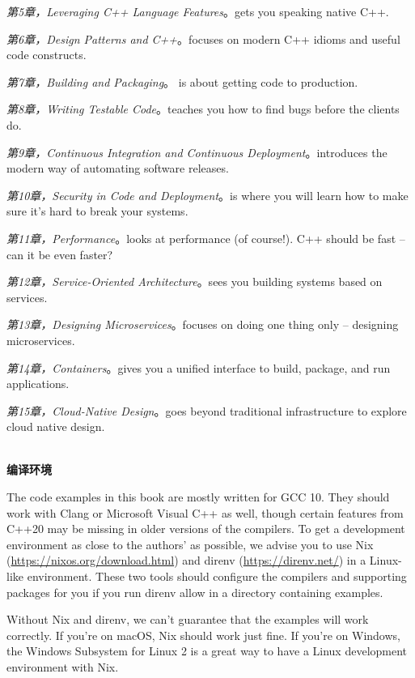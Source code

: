 \textit{第5章，Leveraging C++ Language Features}。gets you speaking native C++.

\textit{第6章，Design Patterns and C++}。focuses on modern C++ idioms and useful code constructs.

\textit{第7章，Building and Packaging}。 is about getting code to production.

\textit{第8章，Writing Testable Code}。teaches you how to find bugs before the clients do.

\textit{第9章，Continuous Integration and Continuous Deployment}。introduces the modern way of automating software releases.


\textit{第10章，Security in Code and Deployment}。is where you will learn how to make sure it's hard to break your systems.

\textit{第11章，Performance}。looks at performance (of course!). C++ should be fast – can it be even faster?


\textit{第12章，Service-Oriented Architecture}。sees you building systems based on services.

\textit{第13章，Designing Microservices}。focuses on doing one thing only – designing microservices.

\textit{第14章，Containers}。gives you a unified interface to build, package, and run applications.

\textit{第15章，Cloud-Native Design}。goes beyond traditional infrastructure to explore cloud native design.

\hspace*{\fill} \\ %
\textbf{编译环境}

The code examples in this book are mostly written for GCC 10. They should work with Clang or Microsoft Visual C++ as well, though certain features from C++20 may be missing in older versions of the compilers. To get a development environment as close to the authors' as possible, we advise you to use Nix (\url{https://nixos.org/download.html}) and direnv (\url{https://direnv.net/}) in a Linux-like environment. These two tools should configure the compilers and supporting packages for you if you run direnv allow in a directory containing examples.

Without Nix and direnv, we can't guarantee that the examples will work correctly. If you're on macOS, Nix should work just fine. If you're on Windows, the Windows Subsystem for Linux 2 is a great way to have a Linux development environment with Nix.

